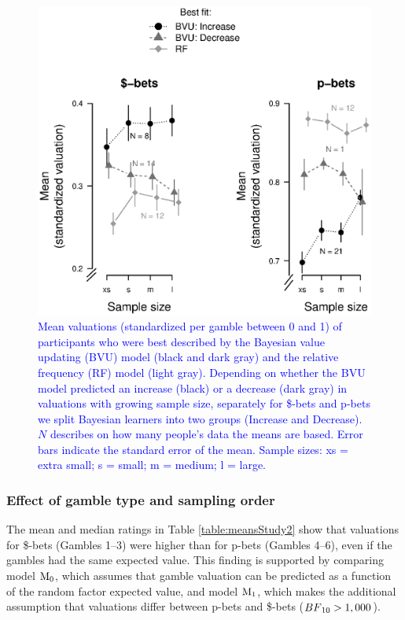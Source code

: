 \documentclass[a4paper, man, natbib, floatsintext]{apa6} %
\begin{document}
\begin{figure}[htbp] 
  \centering
\includegraphics[width=.8\linewidth, keepaspectratio]{groupqual1_stand.eps}
  \caption{\textcolor{blue}{Mean valuations (standardized per gamble between 0 and 1) of participants who were best described by the Bayesian value updating (BVU) model (black and dark gray) and the relative frequency (RF) model (light gray).  Depending on whether the BVU model predicted an increase (black) or a decrease (dark gray) in valuations with growing sample size, separately for \$-bets and p-bets we split Bayesian learners into two groups (Increase and Decrease). $N$ describes on how many people's data the means are based. 
   Error bars indicate the standard error of the mean. Sample sizes: xs = extra small; s = small; m = medium; l = large.}}
  \label{fig:qual1}
\end{figure}

\subsubsection{Effect of gamble type and sampling order}
The mean and median ratings in Table \ref{table:meansStudy2} show that valuations for \$-bets (Gambles 1--3) were higher than for p-bets (Gambles 4--6), even if the gambles had the same expected value. This finding is supported by comparing model $\mathrm{M}\textsubscript{0}$, which assumes that gamble valuation can be predicted as a function of the random factor expected value, and model $\mathrm{M}\textsubscript{1}$, which makes the additional assumption that valuations differ between p-bets and \$-bets ($BF\textsubscript{10} > 1,000$).
\end{document}
